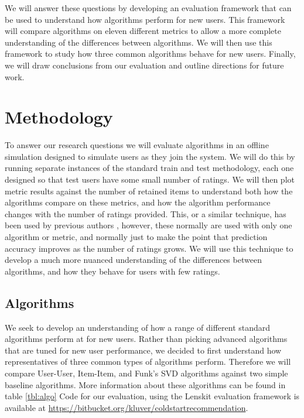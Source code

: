 \documentclass[letterpaper]{sig-alternate}
\begin{document}
  We will answer these questions by developing an evaluation framework that can be used to understand how algorithms perform for new users.
  This framework will compare algorithms on eleven different metrics to allow a more complete understanding of the differences between algorithms.
  We will then use this framework to study how three common algorithms behave for new users.
  Finally, we will draw conclusions from our evaluation and outline directions for future work.

\section{Methodology}
\label{sec:methodology}

  To answer our research questions we will evaluate algorithms in an offline simulation designed to simulate users as they join the system.
  We will do this by running separate instances of the standard train and test methodology, each one designed so that test users have some small number of ratings.
  We will then plot metric results against the number of retained items to understand both how the algorithms compare on these metrics, and how the algorithm performance changes with the number of ratings provided.
  This, or a similar technique, has been used by previous authors \cite{DrennerInitialExperiance, TenIsEnough, AdaptiveBootstrap}, however, these normally are used with only one algorithm or metric, and normally just to make the point that prediction accuracy improves as the number of ratings grows.
  We will use this technique to develop a much more nuanced understanding of the differences between algorithms, and how they behave for users with few ratings.

  \subsection*{Algorithms}

  We seek to develop an understanding of how a range of different standard algorithms perform at for new users.
  Rather than picking advanced algorithms that are tuned for new user performance, we decided to first understand how representatives of three common types of algorithms perform.
  Therefore we will compare User-User, Item-Item, and Funk's SVD algorithms against two simple baseline algorithms.
  More information about these algorithms can be found in table \ref{tbl:algo}
  Code for our evaluation, using the Lenskit evaluation framework \cite{lenskit} is available at \url{https://bitbucket.org/kluver/coldstartrecommendation}.
  
\end{document}
